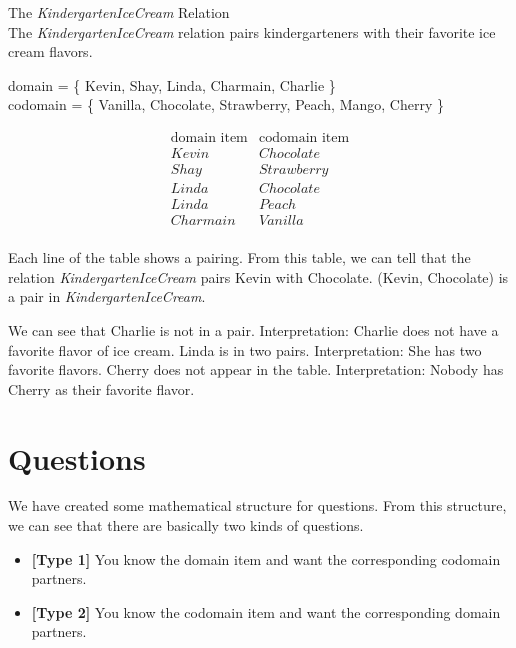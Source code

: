 \documentclass{ximera}
\begin{document}
\begin{example} The \textit{KindergartenIceCream} Relation\\
The \textit{KindergartenIceCream} relation pairs kindergarteners with their favorite ice cream flavors.

domain = \{ Kevin, Shay, Linda, Charmain, Charlie \}  \\
codomain = \{ Vanilla, Chocolate, Strawberry, Peach, Mango, Cherry \} 

\[
\begin{array}{l|l}
    \text{domain item}      & \text{codomain item}      \\ \hline
    Kevin   &  Chocolate \\
    Shay   & Strawberry \\
    Linda  &  Chocolate \\
    Linda  &  Peach \\
    Charmain &  Vanilla \\ 
\end{array}
\]


Each line of the table shows a pairing. From this table, we can tell that the relation \textit{KindergartenIceCream} pairs Kevin with Chocolate.  (Kevin, Chocolate) is a pair in \textit{KindergartenIceCream}.

We can see that Charlie is not in a pair.  Interpretation: Charlie does not have a favorite flavor of ice cream. Linda is in two pairs.  Interpretation: She has two favorite flavors.  Cherry does not appear in the table. Interpretation: Nobody has Cherry as their favorite flavor.

\end{example} 





\section{Questions}


We have created some mathematical structure for questions. From this structure, we can see that there are basically two kinds of questions.

\begin{itemize}
\item \textbf{\textcolor{blue!55!black}{[Type 1]}} You know the domain item and want the corresponding codomain partners.
\item \textbf{\textcolor{blue!55!black}{[Type 2]}} You know the codomain item and want the corresponding domain partners.
\end{itemize}
\end{document}
